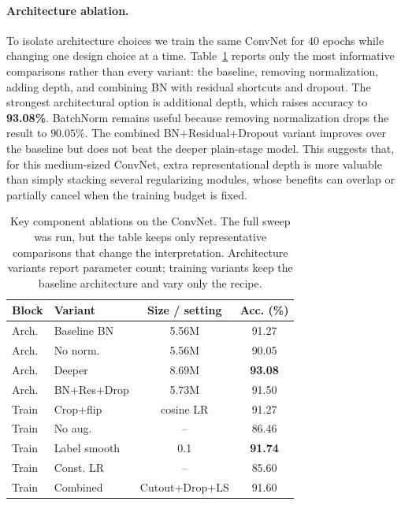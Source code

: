 \documentclass[11pt]{article}
\begin{document}
\paragraph{Architecture ablation.} To isolate architecture choices we
train the same ConvNet for 40 epochs while changing one design choice at a
time. Table~\ref{tab:optional} reports only the most informative comparisons
rather than every variant: the baseline, removing normalization, adding depth,
and combining BN with residual shortcuts and dropout. The strongest
architectural option is additional depth, which raises accuracy to
\textbf{93.08\%}. BatchNorm remains useful because removing normalization drops
the result to $90.05\%$. The combined BN+Residual+Dropout variant improves over
the baseline but does not beat the deeper plain-stage model. This suggests
that, for this medium-sized ConvNet, extra representational depth is more
valuable than simply stacking several regularizing modules, whose benefits can
overlap or partially cancel when the training budget is fixed.

\begin{table}[htbp]
\centering
\small
\caption{Key component ablations on the ConvNet. The full sweep was
run, but the table keeps only representative comparisons that change the
interpretation. Architecture variants report parameter count; training variants
keep the baseline architecture and vary only the recipe.}
\label{tab:optional}
\begin{tabular}{llcc}
\toprule
Block & Variant & Size / setting & Acc. (\%) \\
\midrule
Arch. & Baseline BN & 5.56M & 91.27 \\
Arch. & No norm. & 5.56M & 90.05 \\
Arch. & Deeper & 8.69M & \textbf{93.08} \\
Arch. & BN+Res+Drop & 5.73M & 91.50 \\
\addlinespace
Train & Crop+flip & cosine LR & 91.27 \\
Train & No aug. & -- & 86.46 \\
Train & Label smooth & 0.1 & \textbf{91.74} \\
Train & Const. LR & -- & 85.60 \\
Train & Combined & Cutout+Drop+LS & 91.60 \\
\bottomrule
\end{tabular}
\end{table}
\end{document}
